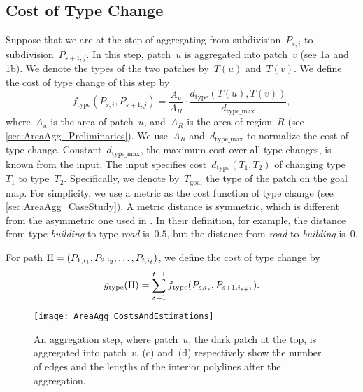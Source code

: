 \subsection{Cost of Type Change}
\label{sec:AreaAgg_f_type}

Suppose that we are at the step of aggregating 
from subdivision~$P_{s,i}$ to subdivision~$P_{s+1,j}$. 
In this step, patch~$u$ is aggregated into patch~$v$
(see \figs\ref{fig:AreaAgg_FirstStep}a 
and \ref{fig:AreaAgg_FirstStep}b).
We denote the types of the two patches by~$T(u)$ and~$T(v)$. 
We define the cost of type change of this step by
\begin{equation}
\label{eq:f_type}
f_\mathrm{type}(P_{s,i},P_{s+1,j})=\frac{A_{u}}{A_R}
\cdot
\frac{d_\mathrm{type}(T(u),T(v))}{d_\mathrm{type\_max}},
\end{equation}
where~$A_u$ is the area of patch~$u$, 
and~$A_R$ is the area of region~$R$
(see \sect\ref{sec:AreaAgg_Preliminaries}).
We use~$A_R$ and~$d_\mathrm{type\_max}$ 
to normalize the cost of type change. 
Constant~$d_\mathrm{type\_max}$, the maximum cost over all type changes,  
is known from the input. 
The input specifies
cost~$d_\mathrm{type}(T_1,T_2)$ of changing type~$T_1$ to type~$T_2$.
Specifically, we denote by~$T_\mathrm{goal}$ the type of 
the patch on the goal map.
For simplicity, we use a metric 
as the cost function of type change
(see \sect\ref{sec:AreaAgg_CaseStudy}).
A metric distance is symmetric, 
which is different from the asymmetric one used in
\textcite{Dilo2009tGAP}.
In their definition, for example, 
the distance from type \emph{building} to type \emph{road} is~$0.5$,
but the distance from \emph{road} to \emph{building} is~$0$.

For path $\Pi=(P_{1,i_1}, P_{2,i_2}, \dots, 
P_{t,i_{t}})$,
we define the cost of type change %
by
\begin{equation}
\label{eq:g_type}
g_\mathrm{type}(\Pi)=
\sum_{s=1}^{t-1}f_\mathrm{type}(P_{s,i_s},P_{s+1,i_{s+1}}).
\end{equation}

\begin{figure}[tb]
\centering
\texttt{[image: AreaAgg\_CostsAndEstimations]}
\caption{An aggregation step, 
	where patch~$u$, the dark patch at the top,
	is aggregated into patch~$v$.
	\figs(c) and~(d) respectively show the number of 
	edges and the lengths of the interior polylines after 
	the aggregation.}
\label{fig:AreaAgg_FirstStep}	
\end{figure}

